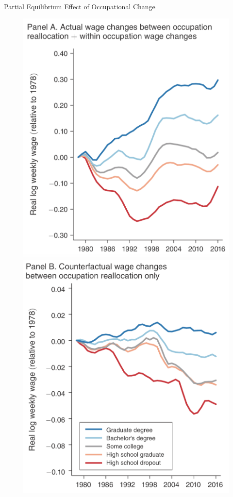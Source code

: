 \documentclass{beamer}
\begin{document}
\begin{frame}{Partial Equilibrium Effect of Occupational Change}

\begin{figure}
	\begin{center}
		\includegraphics[scale=0.2]{Figures/Fig3A_ActualWageChange}
		\includegraphics[scale=0.2]{Figures/Fig3B_CounterfactualWageChange}

\end{center}
\end{figure}
\end{frame}
\end{document}
